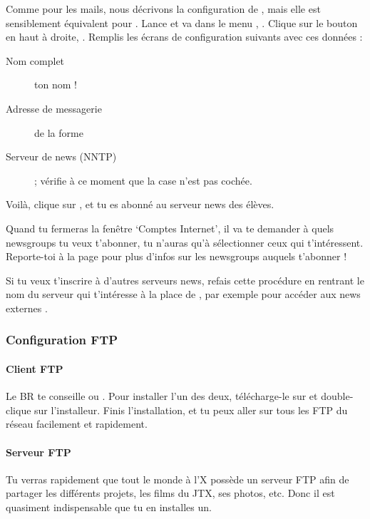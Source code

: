 Comme pour les mails, nous décrivons la configuration de , mais elle est sensiblement équivalent pour . Lance
 et va dans le menu , . Clique sur le bouton  en haut à droite,
. Remplis les écrans de configuration suivants avec ces données :

\begin{description}
  \item[Nom complet] ton nom !
  \item[Adresse de messagerie] de la forme 
  \item[Serveur de news (NNTP)] \fkz ; vérifie à ce moment que la case
        n'est pas cochée.
\end{description}

Voilà, clique sur ,  et tu es abonné
au serveur news des élèves.

Quand tu fermeras la fenêtre `Comptes Internet', il va te demander à
quels newsgroups tu veux t'abonner, tu n'auras qu'à sélectionner
ceux qui t'intéressent. Reporte-toi à la page \pageref{newsgroups}
pour plus d'infos sur les newsgroups auquels t'abonner !

Si tu veux t'inscrire à d'autres serveurs news, refais cette
procédure en rentrant le nom du serveur qui t'intéresse à la place
de \fkz, par exemple pour accéder aux news externes
.


\subsubsection{Configuration FTP}

\paragraph{Client FTP}

Le BR te conseille  ou . Pour installer l'un des deux, télécharge-le sur \xshare et double-clique sur l'installeur.
Finis l'installation, et tu peux aller sur tous les FTP du réseau
facilement et rapidement.

\paragraph{Serveur FTP}

Tu verras rapidement que tout le monde à l'X possède un serveur FTP
afin de partager les différents projets, les films du JTX, ses
photos, etc. Donc il est quasiment indispensable que tu en installes
un.

